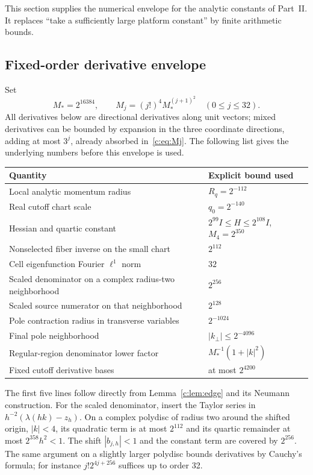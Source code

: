This section supplies the numerical envelope for the analytic constants
of Part~II. It replaces ``take a sufficiently large platform constant''
by finite arithmetic bounds.

\subsection{Fixed-order derivative envelope}
Set
\begin{equation}
 M_*=2^{16384},\qquad
 M_j=(j!)^4M_*^{(j+1)^2}\quad(0\le j\le32).
                                                               \label{c:eq:Mj}
\end{equation}
All derivatives below are directional derivatives along unit vectors;
mixed derivatives can be bounded by expansion in the three coordinate
directions, adding at most $3^j$, already absorbed in~\eqref{c:eq:Mj}.
The following list gives the underlying numbers before this envelope
is used.
\begin{center}
\begin{tabular}{@{}p{}p{}@{}}
\toprule
Quantity & Explicit bound used \\
\midrule
Local analytic momentum radius & $R_q=2^{-112}$ \\
Real cutoff chart scale & $q_0=2^{-140}$ \\
Hessian and quartic constant & $2^{99}I\le H\le2^{108}I$,
 $M_4=2^{350}$ \\
Nonselected fiber inverse on the small chart & $2^{112}$ \\
Cell eigenfunction Fourier $\ell^1$ norm & $32$ \\
Scaled denominator on a complex radius-two neighborhood & $2^{256}$ \\
Scaled source numerator on that neighborhood & $2^{128}$ \\
Pole contraction radius in transverse variables & $2^{-1024}$ \\
Final pole neighborhood & $|k_\perp|\le2^{-4096}$ \\
Regular-region denominator lower factor & $M_*^{-1}(1+|k|^2)$ \\
Fixed cutoff derivative bases & at most $2^{4200}$ \\
\bottomrule
\end{tabular}
\end{center}

The first five lines follow directly from Lemma~\ref{c:lem:edge} and
its Neumann construction. For the scaled denominator, insert the
Taylor series in $h^{-2}(\lambda(hk)-z_h)$.
On a complex polydisc of radius two around the shifted origin,
$|k|<4$, its quadratic term is at most $2^{112}$ and its quartic
remainder at most $2^{358}h^2<1$. The shift $|b_{j,h}|<1$ and the
constant term are covered by $2^{256}$. The same argument on a
slightly larger polydisc bounds derivatives by Cauchy's formula;
for instance $j!2^{4j+256}$ suffices up to order 32.

